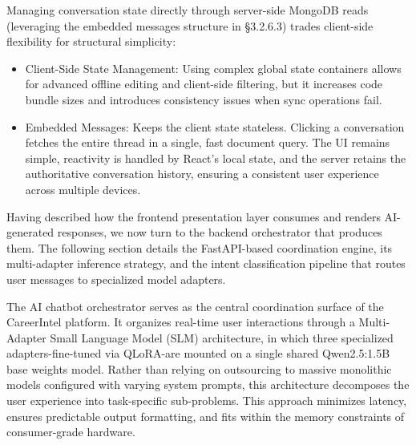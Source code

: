\documentclass[12pt, a4paper]{report}
\begin{document}
\vspace{0.3cm}

Managing conversation state directly through server-side MongoDB reads (leveraging the embedded messages structure in §3.2.6.3) trades client-side flexibility for structural simplicity:
\begin{itemize}
    \item Client-Side State Management: Using complex global state containers allows for advanced offline editing and client-side filtering, but it increases code bundle sizes and introduces consistency issues when sync operations fail.
    \item Embedded Messages: Keeps the client state stateless. Clicking a conversation fetches the entire thread in a single, fast document query. The UI remains simple, reactivity is handled by React's local state, and the server retains the authoritative conversation history, ensuring a consistent user experience across multiple devices.
\end{itemize}

\vspace{0.8cm}
Having described how the frontend presentation layer consumes and renders AI-generated responses, we now turn to the backend orchestrator that produces them. The following section details the FastAPI-based coordination engine, its multi-adapter inference strategy, and the intent classification pipeline that routes user messages to specialized model adapters.

\vspace{0.4cm}
\vspace{0.4cm}

\vspace{0.4cm}

The AI chatbot orchestrator serves as the central coordination surface of the CareerIntel platform. It organizes real-time user interactions through a Multi-Adapter Small Language Model (SLM) architecture, in which three specialized adapters-fine-tuned via QLoRA-are mounted on a single shared Qwen2.5:1.5B base weights model. Rather than relying on outsourcing to massive monolithic models configured with varying system prompts, this architecture decomposes the user experience into task-specific sub-problems. This approach minimizes latency, ensures predictable output formatting, and fits within the memory constraints of consumer-grade hardware.
\end{document}
